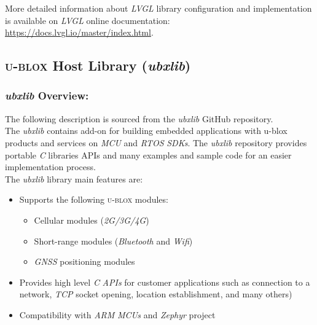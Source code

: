 \documentclass[report.tex]{subfiles}
\begin{document}
More detailed information about \textit{LVGL} library configuration and implementation is available on \textit{LVGL} online documentation: \url{https://docs.lvgl.io/master/index.html}.

\pagebreak

\subsection{\textsc{u-blox} Host Library (\textit{ubxlib})}
\subsubsection{\textit{ubxlib} Overview:}

The following description is sourced from the \textit{ubxlib} GitHub repository\cite{ubx_lib}.\\

The \textit{ubxlib} contains add-on for building embedded applications with u-blox products and services on \textit{MCU} and \textit{RTOS} \textit{SDKs}. The \textit{ubxlib} repository provides portable \textit{C} libraries APIs and many examples and sample code for an easier implementation process.\\


The \textit{ubxlib} library main features are:
\begin{itemize}
\item Supports the following \textsc{u-blox} modules:
\begin{itemize}
\item Cellular modules (\textit{2G/3G/4G})
\item Short-range modules (\textit{Bluetooth} and \textit{Wifi})
\item \textit{GNSS} positioning modules
\end{itemize}
\item Provides high level \textit{C} \textit{APIs} for customer applications such as connection to a network, \textit{TCP} socket opening, location establishment, and many others)
\item Compatibility with \textit{ARM} \textit{MCUs} and \textit{Zephyr} project
\end{itemize}
\end{document}
